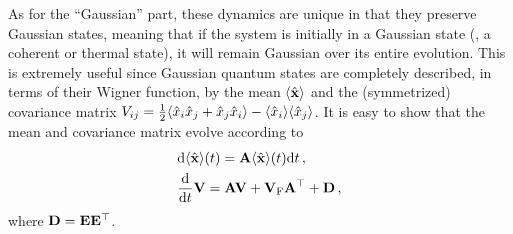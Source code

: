 \documentclass[./Main-revtex.tex]{subfiles}
\begin{document}
As for the ``Gaussian'' part, these dynamics are unique in that they preserve Gaussian states, meaning that if the system is initially in a Gaussian state (\eg, a coherent or thermal state), it will remain Gaussian over its entire evolution. This is extremely useful since Gaussian quantum states are completely described, in terms of their Wigner function, by the mean $\langle \hat{\bf x} \rangle$ and the (symmetrized) covariance matrix $V_{ij} = \frac{1}{2}\langle \hat{x}_i \hat{x}_j + \hat{x}_j \hat{x}_i \rangle - \langle \hat{x}_i \rangle\langle \hat{x}_j \rangle$. It is easy to show \cite{wiseman2009quantum} that the mean and covariance matrix evolve according to 
\begin{align}
&{\rm d} \langle \hat{\bf x} \rangle(t) = {\bf A}\langle \hat{\bf x} \rangle(t) {\rm d} t\,,\\
&\frac{{\rm d}}{{\rm d} t}{\bf V} =  \mathbf{A}\mathbf{V} + \mathbf{V}_{\text F}\mathbf{A}^\top + \mathbf{D}\,,
\end{align}
where ${\bf D} = {\bf E}{\bf E}^\top$.
\end{document}

